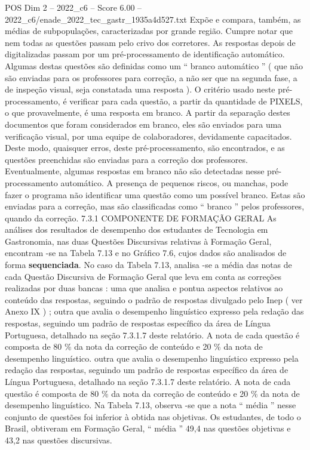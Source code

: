 \begin{textsample}{POS Dim 2 – 2022\_c6 – Score 6.00 – 2022\_c6/enade\_2022\_tec\_gastr\_1935a4d527.txt}
Expõe e compara, também, as médias de subpopulações, caracterizadas por grande região.
Cumpre notar que nem todas as questões passam pelo crivo dos corretores.
As respostas depois de digitalizadas passam por um pré-processamento de identificação automático.
Algumas destas questões são definidas como um “ branco automático ” ( que não são enviadas para os professores para correção, a não ser que na segunda fase, a de inspeção visual, seja constatada uma resposta ).
O critério usado neste pré-processamento, é verificar para cada questão, a partir da quantidade de PIXELS, o que provavelmente, é uma resposta em branco.
A partir da separação destes documentos que foram considerados em branco, eles são enviados para uma verificação visual, por uma equipe de colaboradores, devidamente capacitados.
Deste modo, quaisquer erros, deste pré-processamento, são encontrados, e as questões preenchidas são enviadas para a correção dos professores.
Eventualmente, algumas respostas em branco não são detectadas nesse pré-processamento automático.
A presença de pequenos riscos, ou manchas, pode fazer o programa não identificar uma questão como um possível branco.
Estas são enviadas para a correção, mas são classificadas como “ branco ” pelos professores, quando da correção. 7.3.1 COMPONENTE DE FORMAÇÃO GERAL As análises dos resultados de desempenho dos estudantes de Tecnologia em Gastronomia, nas duas Questões Discursivas relativas à Formação Geral, encontram -se na Tabela 7.13 e no Gráfico 7.6, cujos dados são analisados de forma \textbf{sequenciada}.
No caso da Tabela 7.13, analisa -se a média das notas de cada Questão Discursiva de Formação Geral que leva em conta as correções realizadas por duas bancas : uma que analisa e pontua aspectos relativos ao conteúdo das respostas, seguindo o padrão de respostas divulgado pelo Inep ( ver Anexo IX ) ; outra que avalia o desempenho linguístico expresso pela redação das respostas, seguindo um padrão de respostas específico da área de Língua Portuguesa, detalhado na seção 7.3.1.7 deste relatório.
A nota de cada questão é composta de 80 \% da nota da correção de conteúdo e 20 \% da nota de desempenho linguístico. outra que avalia o desempenho linguístico expresso pela redação das respostas, seguindo um padrão de respostas específico da área de Língua Portuguesa, detalhado na seção 7.3.1.7 deste relatório.
A nota de cada questão é composta de 80 \% da nota da correção de conteúdo e 20 \% da nota de desempenho linguístico.
Na Tabela 7.13, observa -se que a nota “ média ” nesse conjunto de questões foi inferior à obtida nas objetivas.
Os estudantes, de todo o Brasil, obtiveram em Formação Geral, “ média ” 49,4 nas questões objetivas e 43,2 nas questões discursivas.

\end{textsample}
